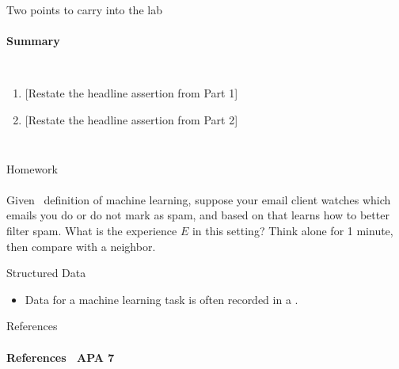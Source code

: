 \documentclass[aspectratio=169,10pt]{beamer}
\newcommand{\orange}[1]{\color{ccisOrangeText}{#1}}
\begin{document}
\begin{frame}{Two points to carry into the lab}
  \framesubtitle{Summary}
  \begin{columns}[T,onlytextwidth]
      \begin{enumerate}\setlength{\itemsep}{4mm}
        \item {[Restate the headline assertion from Part 1]}
        \item {[Restate the headline assertion from Part 2]}
      \end{enumerate}
      \begin{nextsteps}\small
      \end{nextsteps}
  \end{columns}
\end{frame}



\begin{frame}{Homework}
	\framesubtitle{\checklabel}
	Given~\textcite{mitchell1997machine} definition of machine learning, suppose your email client watches which emails you do or do not mark as spam, and based on that learns how to better filter spam. What is the experience $E$ in this setting?
	\vfill
	{\color{ccisMuted}Think alone for 1 minute, then compare with a neighbor.}\par
	\vskip3mm
\end{frame}


\begin{frame}{Structured Data}
	\begin{itemize}
		\item Data for a machine learning task is often recorded in a \orange{table}.
	\end{itemize}
\end{frame}

\begin{frame}[allowframebreaks]{References}
  \framesubtitle{References \textperiodcentered\ APA 7}
  \cornerlogo
  \fontsize{8}{10.5}\selectfont
  \nocite{*}
  \printbibliography[heading=none]
\end{frame}
\end{document}
